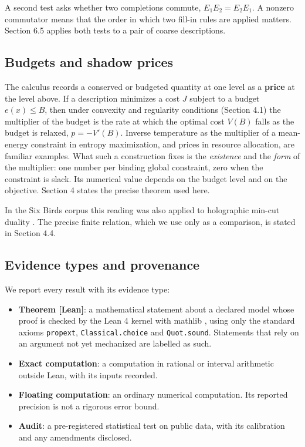 A second test asks whether two completions commute, \(E_1E_2=E_2E_1\). A
nonzero commutator means that the order in which two fill-in rules are
applied matters. Section 6.5 applies both tests to a pair of coarse
descriptions.

\hypertarget{budgets-and-shadow-prices}{%
\subsection{Budgets and shadow
prices}\label{budgets-and-shadow-prices}}

The calculus records a conserved or budgeted quantity at one level as a
\textbf{price} at the level above. If a description minimizes a cost
\(J\) subject to a budget \(e(x)\le B\), then under convexity and
regularity conditions (Section 4.1) the multiplier of the budget is the
rate at which the optimal cost \(V(B)\) falls as the budget is relaxed,
\(p=-V'(B)\). Inverse temperature as the multiplier of a mean-energy
constraint in entropy maximization, and prices in resource allocation,
are familiar examples. What such a construction fixes is the
\emph{existence} and the \emph{form} of the multiplier: one number per
binding global constraint, zero when the constraint is slack. Its
numerical value depends on the budget level and on the objective.
Section 4 states the precise theorem used here.

In the Six Birds corpus this reading was also applied to holographic
min-cut duality \citep{RyuTakayanagi2006, FreedmanHeadrick2017}. The
precise finite relation, which we use only as a comparison, is stated in
Section 4.4.

\hypertarget{evidence-types-and-provenance}{%
\subsection{Evidence types and
provenance}\label{evidence-types-and-provenance}}

We report every result with its evidence type:

\begin{itemize}
\tightlist
\item
  \textbf{Theorem {[}Lean{]}}: a mathematical statement about a declared
  model whose proof is checked by the Lean 4 kernel with mathlib
  \citep{deMoura2021, mathlib2020}, using only the standard axioms
  \texttt{propext}, \texttt{Classical.choice} and \texttt{Quot.sound}.
  Statements that rely on an argument not yet mechanized are labelled as
  such.
\item
  \textbf{Exact computation}: a computation in rational or interval
  arithmetic outside Lean, with its inputs recorded.
\item
  \textbf{Floating computation}: an ordinary numerical computation. Its
  reported precision is not a rigorous error bound.
\item
  \textbf{Audit}: a pre-registered statistical test on public data, with
  its calibration and any amendments disclosed.
\end{itemize}

